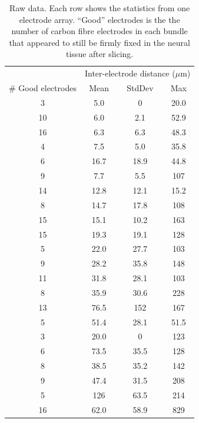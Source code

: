 \documentclass[10pt,letterpaper]{article}
\begin{document}
\begin{table}
  \begin{tabular}{cccc}
    & \multicolumn{3}{c}{Inter-electrode distance ($\mu$m)} \\
    \# Good electrodes & Mean & StdDev & Max \\
    \hline
     3  &  5.0    &    0 &  20.0 \\
   10  &  6.0   & 2.1 &  52.9 \\
   16  &  6.3   & 6.3 &  48.3 \\
    4  &  7.5   & 5.0 &  35.8 \\
    6  & 16.7  & 18.9 &  44.8 \\
    9  &  7.7   & 5.5 & 107 \\
   14 &  12.8  & 12.1 & 15.2 \\
    8 &  14.7  & 17.8 & 108 \\
   15&   15.1  & 10.2 & 163 \\
   15  & 19.3  & 19.1 & 128 \\
    5  & 22.0  & 27.7 & 103 \\
    9  & 28.2   & 35.8 & 148 \\
   11 &  31.8  & 28.1 & 103 \\
    8  & 35.9  & 30.6 & 228 \\
   13 &  76.5 & 152 & 167 \\
    5  & 51.4  & 28.1 &  51.5 \\
    3  & 20.0    &     0 & 123 \\
    6  & 73.5  & 35.5 & 128 \\
    8  & 38.5  & 35.2 & 142 \\
    9  & 47.4  & 31.5 & 208 \\
    5 & 126  & 63.5&  214 \\
    16 &  62.0 &  58.9&  829
  \end{tabular}
  \caption{Raw data.  Each row shows the statistics from one electrode
    array.  ``Good'' electrodes is the the number of carbon fibre
    electrodes in each bundle that appeared to still be firmly fixed
    in the neural tissue after slicing.}
  \label{table:splaydata}
\end{table}
\end{document}
